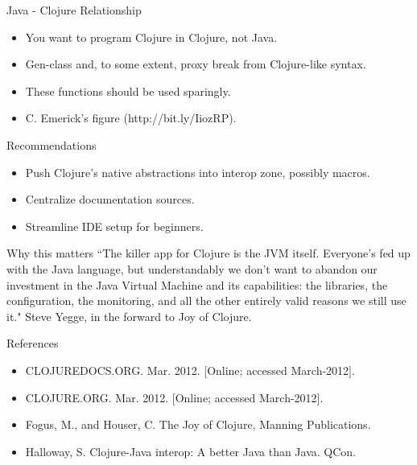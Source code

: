 \documentclass[xcolor=dvipsnames]{beamer}
\begin{document}
	\begin{frame}{Java - Clojure Relationship}
	\begin{itemize}	
	\item You want to program Clojure in Clojure, not Java.
	\item Gen-class and, to some extent, proxy break from Clojure-like syntax.
	\item These functions should be used sparingly.
	\item C. Emerick's figure (http://bit.ly/IiozRP).
	\end{itemize}
	\end{frame}
	
	\begin{frame}{Recommendations}
	\begin{itemize}
		\item Push Clojure's native abstractions into interop zone, possibly macros.
		\item Centralize documentation sources.
		\item Streamline IDE setup for beginners.
	\end{itemize}
	\end{frame}
	
	\begin{frame}{Why this matters}
		``The killer app for Clojure is the JVM itself. Everyone's fed up with the Java language, but understandably we don't want to abandon our investment in the Java Virtual Machine and its capabilities: the libraries, the configuration, the monitoring, and all the other entirely valid reasons we still use it."  
		\newline
		Steve Yegge, in the forward to Joy of Clojure.
	\end{frame}
	
	\begin{frame}{References}
	\begin{itemize}
	\item CLOJUREDOCS.ORG. Mar. 2012. [Online; accessed March-2012].
	\item CLOJURE.ORG. Mar. 2012. [Online; accessed March-2012].
	\item Fogus, M., and Houser, C. The Joy of Clojure, Manning Publications.
	\item Halloway, S. Clojure-Java interop: A better Java than Java. QCon.
	\end{itemize}
	\end{frame}
\end{document}
